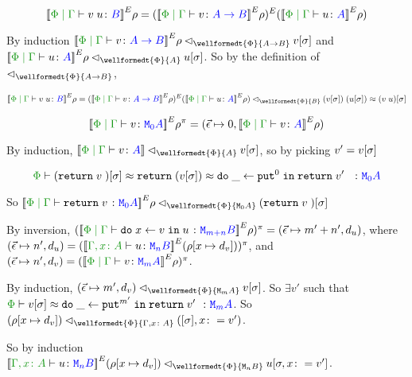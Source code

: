 \documentclass{Report}
\newcommand\eLogRel[4]{\logRel{#2}{\wellformedt{#1}{#3}}{#4}}
\newcommand\peLogRel[3]{\eLogRel{\P}{#1}{#2}{#3}}
\newcommand{\zpberelation}[2]{\berelation{\P}{#1}{#2}}
\newcommand{\fapply}[0]{^E}
\newcommand\liftp[0]{^\pi}
\begin{document}
\case{\vapply}
\begin{equation}
    \deno{\gpetyperelation{\apply{v}{u}}{B}}\fapply\rho = (\deno{\gpetyperelation{v}{\ab}}\fapply\rho)\fapply(\deno{\gpetyperelation{u}{A}}\fapply\rho)
\end{equation}

By induction $\peLogRel{\deno{\gpetyperelation{v}{\ab}}\fapply\rho}{\ab}{v\ssi}$ and $\peLogRel{\deno{\gpetyperelation{u}{A}}\fapply\rho}{A}{u\ssi}$. So by the definition of $\relates_{\wellformedt{\P}{\ab}}$, 

\begin{align*}
    \deno{\gpetyperelation{\apply{v}{u}}{B}}\fapply\rho =\peLogRel{(\deno{\gpetyperelation{v}{\ab}}\fapply\rho)\fapply(\deno{\gpetyperelation{u}{A}}\fapply\rho)}{B}{\apply{(v\ssi)}{(u\ssi)}\beequiv (\apply{v}{u})\ssi}
\end{align*}

\case{\vreturn}

\begin{equation}
    \deno{\gpetyperelation{v}{\M{0}{A}}}\fapply\rho\liftp = (\ev\mapsto 0, \deno{\gpetyperelation{v}{A}}\fapply\rho)
\end{equation}

By induction, $\peLogRel{\deno{\gpetyperelation{v}{A}}}{A}{v\ssi}$, so by picking $v' = v[\sigma]$

\begin{equation}
    \zpberelation{(\return{v})\ssi}{\return{(v\ssi)\beequiv \doin{\_}{\put^0}{\return{v'}}}}{\M{0}{A}}
\end{equation}

So $\peLogRel{\deno{\gpetyperelation{\return{v}}{\M{0}{A}}}\fapply\rho}{\M{0}{A}}{(\return{v})\ssi}$

\case{\vbind}

By inversion, $(\deno{\gpetyperelation{\doin{x}{v}{u}}{\M{m+n}{B}}}\fapply\rho)\liftp = (\ev\mapsto m'+n', d_u)$, where $(\ev\mapsto n', d_u) = (\deno{\typerelation{\gax}{u}{\mnb}}\fapply(\rho[x\mapsto d_v]))\liftp$, and $(\ev\mapsto n', d_v) = (\deno{\gpetyperelation{v}{\mma}}\fapply\rho)\liftp$.

By induction, $\peLogRel{(\ev\mapsto m', d_v)}{\mma}{v\ssi}$. So $\exists v'$ such that $\zpberelation{v\ssi}{\doin{\_}{\put^{m'}}{\return{v'}}}{\mma}$. So $\peLogRel{(\rho[x\mapsto d_v])}{\gax}{(\ssi, x\setto v')}$.

So by induction $\peLogRel{\deno{\typerelation{\gax}{u}{\mnb}}\fapply(\rho[x\mapsto d_v])}{\mnb}{u\sub{\si, x\setto v'}}$.
\end{document}
